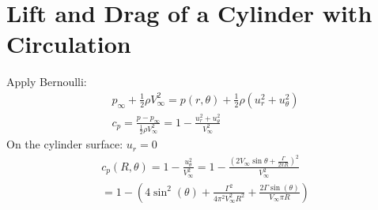 \documentclass[class=report, crop=false, 12pt,a4paper]{standalone}
\begin{document}
\section{Lift and Drag of a Cylinder with Circulation}
Apply Bernoulli:
\begin{gather}
  p_{\infty} + \frac{1}{2}\rho V_{\infty}^2 = p(r,\theta) + \frac{1}{2}\rho(u_r^2+u_{\theta}^2)\\
  c_p = \frac{p - p_{\infty}}{\frac{1}{2}\rho V_{\infty}^2} = 1 - \frac{u_r^2 + u_{\theta}^2}{V_{\infty}^2}
\end{gather}
On the cylinder surface: $u_r = 0$
\begin{gather}
  c_p (R,\theta) = 1 - \frac{u_{\theta}^2}{V_{\infty}^2}=1-\frac{(2V_{\infty}\sin\theta + \frac{\Gamma}{2\pi R})^2}{V_{\infty}^2} \\
  = 1-\left(4\sin^2(\theta)+\frac{\Gamma^2}{4\pi^2V_{\infty}^2R^2}+\frac{2\Gamma\sin(\theta)}{V_{\infty}\pi R}\right)
\end{gather}
\end{document}
